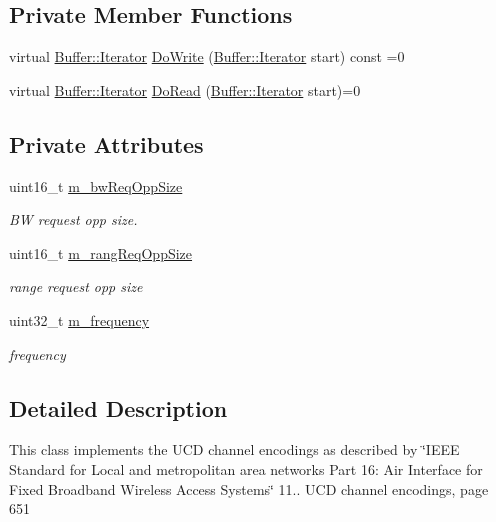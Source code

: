 \subsection*{Private Member Functions}
\begin{DoxyCompactItemize}
\item 
virtual \hyperlink{classns3_1_1Buffer_1_1Iterator}{Buffer\+::\+Iterator} \hyperlink{classns3_1_1UcdChannelEncodings_a68c65fec7a16169dcbec8d7ef24c296e}{Do\+Write} (\hyperlink{classns3_1_1Buffer_1_1Iterator}{Buffer\+::\+Iterator} start) const =0
\item 
virtual \hyperlink{classns3_1_1Buffer_1_1Iterator}{Buffer\+::\+Iterator} \hyperlink{classns3_1_1UcdChannelEncodings_a126b14925914be4848d134a41e441c91}{Do\+Read} (\hyperlink{classns3_1_1Buffer_1_1Iterator}{Buffer\+::\+Iterator} start)=0
\end{DoxyCompactItemize}
\subsection*{Private Attributes}
\begin{DoxyCompactItemize}
\item 
uint16\+\_\+t \hyperlink{classns3_1_1UcdChannelEncodings_a26a48aaaf57003262302adbfce6d5f0c}{m\+\_\+bw\+Req\+Opp\+Size}
\begin{DoxyCompactList}\small\item\em BW request opp size. \end{DoxyCompactList}\item 
uint16\+\_\+t \hyperlink{classns3_1_1UcdChannelEncodings_a91a0d665b88ad3d3b73118d4a632c0e6}{m\+\_\+rang\+Req\+Opp\+Size}
\begin{DoxyCompactList}\small\item\em range request opp size \end{DoxyCompactList}\item 
uint32\+\_\+t \hyperlink{classns3_1_1UcdChannelEncodings_a72ba94cddb5f801b46519154b8b869bd}{m\+\_\+frequency}
\begin{DoxyCompactList}\small\item\em frequency \end{DoxyCompactList}\end{DoxyCompactItemize}


\subsection{Detailed Description}
This class implements the U\+CD channel encodings as described by \char`\"{}\+I\+E\+E\+E Standard for
\+Local and metropolitan area networks Part 16\+: Air Interface for Fixed Broadband Wireless Access Systems\char`\"{} 11.. U\+CD channel encodings, page 651 

